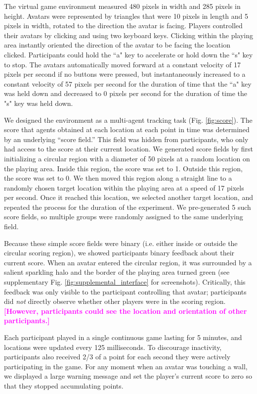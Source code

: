 \documentclass[12pt,letterpaper]{article}
\newcommand{\andrew}[1]{\textcolor{magenta}{\bf [#1]}}
\begin{document}
The virtual game environment measured 480 pixels in width and 285 pixels in height.
Avatars were represented by triangles that were 10 pixels in length and 5 pixels in width, rotated to the direction the avatar is facing. 
Players controlled their avatars by clicking and using two keyboard keys. 
Clicking within the playing area instantly oriented the direction of the avatar to be facing the location clicked. 
Participants could hold the ``a" key to accelerate or hold down the ``s" key to stop.  
The avatars automatically moved forward at a constant velocity of 17 pixels per second if no buttons were pressed, but instantaneously increased to a constant velocity of 57 pixels per second for the duration of time that the ``a" key was held down and decreased to 0 pixels per second for the duration of time the "s" key was held down. 

We designed the environment as a multi-agent tracking task (Fig. \ref{fig:score}).
The score that agents obtained at each location at each point in time was determined by an underlying ``score field.'' 
This field was hidden from participants, who only had access to the score at their current location. 
We generated score fields by first initializing a circular region with a diameter of 50 pixels at a random location on the playing area. 
Inside this region, the score was set to 1.
Outside this region, the score was set to 0.
We then moved this region along a straight line to a randomly chosen target location within the playing area at a speed of 17 pixels per second.
Once it reached this location, we selected another target location, and repeated the process for the duration of the experiment.
We pre-generated 5 such score fields, so multiple groups were randomly assigned to the same underlying field.  

Because these simple score fields were binary (i.e. either inside or outside the circular scoring region), we showed participants binary feedback about their current score.
When an avatar entered the circular region, it was surrounded by a salient sparkling halo and the border of the playing area turned green (see supplementary Fig. \ref{fig:supplemental_interface} for screenshots). 
Critically, this feedback was only visible to the participant controlling that avatar; participants did \emph{not} directly observe whether other players were in the scoring region. \andrew{However, participants could see the location and orientation of other participants.}

Each participant played in a single
continuous game lasting for 5 minutes, and locations were updated every 125 milliseconds. 
To discourage inactivity, participants also received 2/3 of a point for each second they were actively participating in the game.
For any moment when an avatar was touching a wall, we displayed a large warning message and set the player's current score to zero so that they stopped accumulating points.
\end{document}
